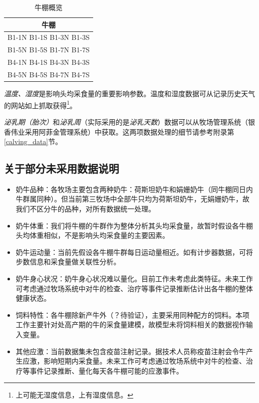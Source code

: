 \begin{table}
\caption{牛棚概览}
\label{cowshed}
\footnotesize
\begin{center}
\begin{tabular}{|c|}
\hline
	\textbf{牛棚}  \\
\hline
    B1-1N  B1-1S  
    B1-3N  B1-3S  \\
    B1-5N  B1-5S  
    B1-7N  B1-7S  \\
    B4-1N  B4-1S  
    B4-3N  B4-3S  \\
    B4-5N  B4-5S  
    B4-7N  B4-7S  \\
\hline
\end{tabular}
\end{center}
\end{table}


\emph{温度、湿度}是影响头均采食量的重要影响参数。温度和湿度数据可从记录历史天气的网站如\cite{weather,tianqi}上抓取获得\footnote{\cite{weather}上可能无湿度信息，\cite{tianqi}上有湿度信息。}。

\emph{泌乳期（胎次）}和\emph{泌乳周}（实际采用的是\emph{泌乳天数}）数据可以从牧场管理系统（银香伟业采用阿菲金管理系统）中获取。这两项数据处理的细节请参考附录第\ref{calving_data}节。



\subsection{关于部分未采用数据说明} 
\begin{itemize}
\item 奶牛品种：各牧场主要包含两种奶牛：荷斯坦奶牛和娟姗奶牛（同牛棚同日内牛群属同种）。但当前第三牧场中全部牛只均为荷斯坦奶牛，无娟姗奶牛，故我们不区分牛的品种，对所有数据统一处理。

\item 奶牛体重：我们将牛棚的牛群作为整体分析其头均采食量，故暂时假设各牛棚头均体重相似，不是影响头均采食量的主要因素。

\item 奶牛运动量：当前先假设各牛棚牛群每日运动量相近。如有计步器数据，可将步数信息和采食量做关联性分析。

\item 奶牛身心状况：奶牛身心状况难以量化。目前工作未考虑此类特征。未来工作可考虑通过牧场系统中对牛的检查、治疗等事件记录推断估计出各牛棚的整体健康状态。

\item 饲料特性：各牛棚除新产牛外（？待验证），主要采用同种配方的饲料。本项工作主要针对处高产期的牛的采食量建模，故模型未将饲料相关的数据视作输入变量。

\item 其他应激：当前数据集未包含疫苗注射记录。据技术人员称疫苗注射会令牛产生应激，影响短期内采食量。未来工作可考虑通过牧场系统中对牛的检查、治疗等事件记录推断、量化每天各牛棚可能的应激事件。
\end{itemize}



